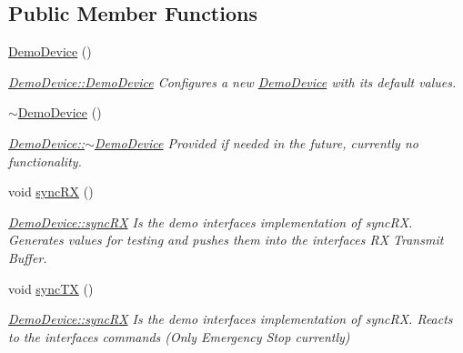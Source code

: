 \subsection*{Public Member Functions}
\begin{DoxyCompactItemize}
\item 
\hypertarget{class_demo_device_a9fc771c4152f0d9de78a69187cbd7a58}{}\label{class_demo_device_a9fc771c4152f0d9de78a69187cbd7a58} 
\hyperlink{class_demo_device_a9fc771c4152f0d9de78a69187cbd7a58}{Demo\+Device} ()
\begin{DoxyCompactList}\small\item\em \hyperlink{class_demo_device_a9fc771c4152f0d9de78a69187cbd7a58}{Demo\+Device\+::\+Demo\+Device} Configures a new \hyperlink{class_demo_device}{Demo\+Device} with its default values. \end{DoxyCompactList}\item 
\hypertarget{class_demo_device_aff994361f45ae993feb854f72a2a32a6}{}\label{class_demo_device_aff994361f45ae993feb854f72a2a32a6} 
\hyperlink{class_demo_device_aff994361f45ae993feb854f72a2a32a6}{$\sim$\+Demo\+Device} ()
\begin{DoxyCompactList}\small\item\em \hyperlink{class_demo_device_aff994361f45ae993feb854f72a2a32a6}{Demo\+Device\+::$\sim$\+Demo\+Device} Provided if needed in the future, currently no functionality. \end{DoxyCompactList}\item 
\hypertarget{class_demo_device_a85671c408f6f08d82a09344ef5f34966}{}\label{class_demo_device_a85671c408f6f08d82a09344ef5f34966} 
void \hyperlink{class_demo_device_a85671c408f6f08d82a09344ef5f34966}{sync\+RX} ()
\begin{DoxyCompactList}\small\item\em \hyperlink{class_demo_device_a85671c408f6f08d82a09344ef5f34966}{Demo\+Device\+::sync\+RX} Is the demo interface\textquotesingle{}s implementation of sync\+RX. Generates values for testing and pushes them into the interface\textquotesingle{}s RX Transmit Buffer. \end{DoxyCompactList}\item 
\hypertarget{class_demo_device_a4b33b0148627fcbd22a0704e80f05d7d}{}\label{class_demo_device_a4b33b0148627fcbd22a0704e80f05d7d} 
void \hyperlink{class_demo_device_a4b33b0148627fcbd22a0704e80f05d7d}{sync\+TX} ()
\begin{DoxyCompactList}\small\item\em \hyperlink{class_demo_device_a85671c408f6f08d82a09344ef5f34966}{Demo\+Device\+::sync\+RX} Is the demo interface\textquotesingle{}s implementation of sync\+RX. Reacts to the interfaces commands (Only Emergency Stop currently) \end{DoxyCompactList}\item 

\end{DoxyCompactItemize}
